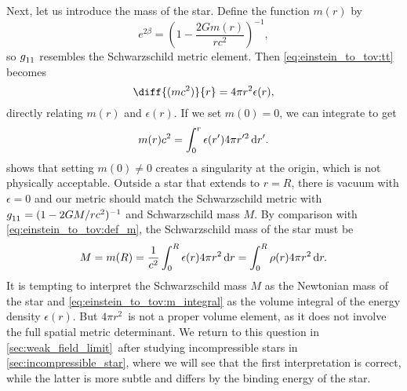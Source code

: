 Next, let us introduce the mass of the star.
Define the function $m(r)$ by
\begin{equation}
	e^{2 \beta} = \left( 1 - \frac{2 G m(r)}{r c^2} \right)^{-1} ,
	\label{eq:einstein_to_tov:def_m}
\end{equation}
so $g\indices{_1_1}$ resembles the Schwarzschild metric element.
Then \cref{eq:einstein_to_tov:tt} becomes
\begin{equation}
	\diff{(m c^2)}{r} = 4 \pi r^2 \epsilon(r) ,
	\label{eq:einstein_to_tov:m_rho}
\end{equation}
directly relating $m(r)$ and $\epsilon(r)$.
If we set $m(0) = 0$, we can integrate to get
\begin{equation}
	m(r) c^2 = \integral{\epsilon(r') 4 \pi r'^2}{r'}{0}{r} .
	\label{eq:einstein_to_tov:m_integral}
\end{equation}
\cite[page 602]{ref:mtw} shows that setting $m(0) \neq 0$ creates a singularity at the origin, which is not physically acceptable.
Outside a star that extends to $r = R$, there is vacuum with $\epsilon = 0$ and our metric should match the Schwarzschild metric with $g\indices{_1_1} = (1-2GM/rc^2)^{-1}$ and Schwarzschild mass $M$.
By comparison with \cref{eq:einstein_to_tov:def_m}, the Schwarzschild mass of the star must be
\begin{equation}
	M = m(R) = \frac{1}{c^2} \integral{\epsilon(r) 4 \pi r^2}{r}{0}{R} = \integral{\rho(r) 4 \pi r^2}{r}{0}{R}.
	\label{eq:einstein_to_tov:schwarzschild_mass}
\end{equation}
It is tempting to interpret the Schwarzschild mass $M$ as the Newtonian mass of the star and \eqref{eq:einstein_to_tov:m_integral} as the volume integral of the energy density $\epsilon(r)$.
But $4 \pi r^2$ is not a proper volume element, as it does not involve the full spatial metric determinant.
We return to this question in \cref{sec:weak_field_limit} after studying incompressible stars in \cref{sec:incompressible_star}, where we will see that the first interpretation is correct, while the latter is more subtle and differs by the binding energy of the star.

